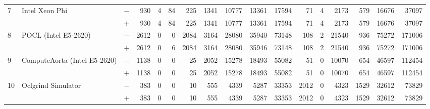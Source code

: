 \begin{tabular}{lll | rrrrrrr | rrrrrrr }
\hline
\multirow{ 2}{*}{7} & \multirow{ 2}{*}{Intel Xeon Phi} & $-$ & 930 & 4 & 84 & 225 & 1341 & 10777 & 13361       & 17594 & 71 & 4 & 2173 & 579 & 16676 & 37097 \\& & $+$ & 930 & 4 & 84 & 225 & 1341 & 10777 & 13361 & 17594 & 71 & 4 & 2173 & 579 & 16676 & 37097 \\
\hline
\multirow{ 2}{*}{8} & \multirow{ 2}{*}{POCL (Intel E5-2620)} & $-$ & 2612 & 0 & 0 & 2084 & 3164 & 28080 & 35940       & 73148 & 108 & 2 & 21540 & 936 & 75272 & 171006 \\& & $+$ & 2612 & 0 & 6 & 2084 & 3164 & 28080 & 35946 & 73148 & 108 & 2 & 21540 & 936 & 75272 & 171006 \\
\hline
\multirow{ 2}{*}{9} & \multirow{ 2}{*}{ComputeAorta (Intel E5-2620)} & $-$ & 1138 & 0 & 0 & 25 & 2052 & 15278 & 18493       & 55082 & 51 & 0 & 10070 & 654 & 46597 & 112454 \\& & $+$ & 1138 & 0 & 0 & 25 & 2052 & 15278 & 18493 & 55082 & 51 & 0 & 10070 & 654 & 46597 & 112454 \\
\hline
\multirow{ 2}{*}{10} & \multirow{ 2}{*}{Oclgrind Simulator} & $-$ & 383 & 0 & 0 & 10 & 555 & 4339 & 5287       & 33353 & 2012 & 0 & 4323 & 1529 & 32612 & 73829 \\& & $+$ & 383 & 0 & 0 & 10 & 555 & 4339 & 5287 & 33353 & 2012 & 0 & 4323 & 1529 & 32612 & 73829 \\
  \bottomrule
\end{tabular}

